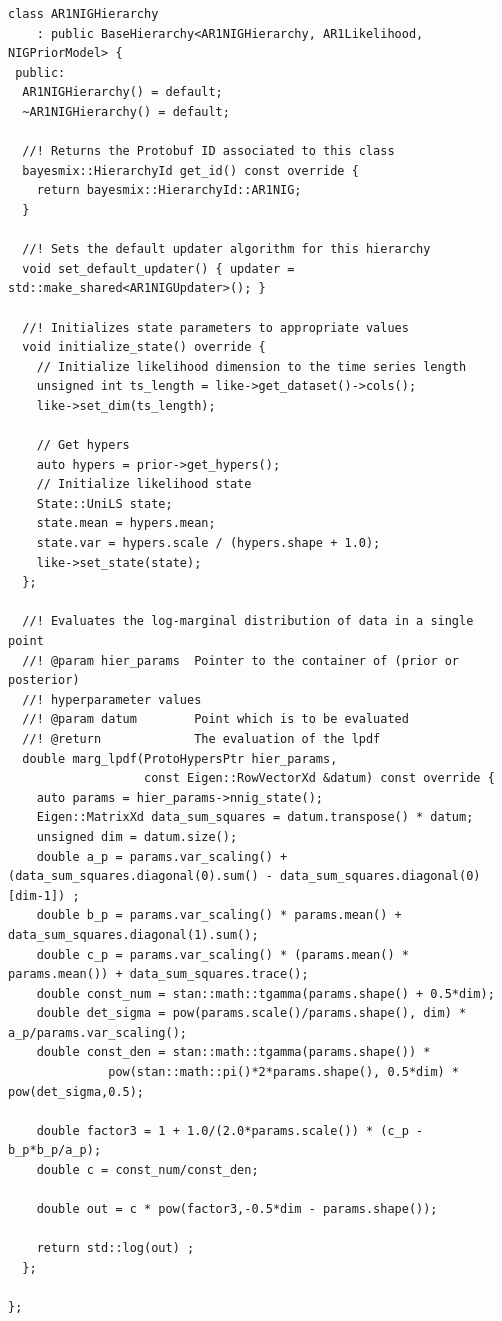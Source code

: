 \documentclass[12pt,a4paper]{article}
\begin{document}
\begin{lstlisting}[]
class AR1NIGHierarchy
    : public BaseHierarchy<AR1NIGHierarchy, AR1Likelihood, NIGPriorModel> {
 public:
  AR1NIGHierarchy() = default;
  ~AR1NIGHierarchy() = default;

  //! Returns the Protobuf ID associated to this class
  bayesmix::HierarchyId get_id() const override {
    return bayesmix::HierarchyId::AR1NIG;
  }

  //! Sets the default updater algorithm for this hierarchy
  void set_default_updater() { updater = std::make_shared<AR1NIGUpdater>(); }

  //! Initializes state parameters to appropriate values
  void initialize_state() override {
    // Initialize likelihood dimension to the time series length
    unsigned int ts_length = like->get_dataset()->cols();
    like->set_dim(ts_length);

    // Get hypers
    auto hypers = prior->get_hypers();
    // Initialize likelihood state
    State::UniLS state;
    state.mean = hypers.mean;
    state.var = hypers.scale / (hypers.shape + 1.0);
    like->set_state(state);
  };

  //! Evaluates the log-marginal distribution of data in a single point
  //! @param hier_params  Pointer to the container of (prior or posterior)
  //! hyperparameter values
  //! @param datum        Point which is to be evaluated
  //! @return             The evaluation of the lpdf
  double marg_lpdf(ProtoHypersPtr hier_params,
                   const Eigen::RowVectorXd &datum) const override {
    auto params = hier_params->nnig_state();
    Eigen::MatrixXd data_sum_squares = datum.transpose() * datum;
    unsigned dim = datum.size();
    double a_p = params.var_scaling() + (data_sum_squares.diagonal(0).sum() - data_sum_squares.diagonal(0)[dim-1]) ;
    double b_p = params.var_scaling() * params.mean() + data_sum_squares.diagonal(1).sum();
    double c_p = params.var_scaling() * (params.mean() * params.mean()) + data_sum_squares.trace();
    double const_num = stan::math::tgamma(params.shape() + 0.5*dim);
    double det_sigma = pow(params.scale()/params.shape(), dim) * a_p/params.var_scaling();
    double const_den = stan::math::tgamma(params.shape()) *
              pow(stan::math::pi()*2*params.shape(), 0.5*dim) * pow(det_sigma,0.5);

    double factor3 = 1 + 1.0/(2.0*params.scale()) * (c_p - b_p*b_p/a_p);
    double c = const_num/const_den;

    double out = c * pow(factor3,-0.5*dim - params.shape());

    return std::log(out) ;
  };

};
\end{lstlisting}
\end{document}
